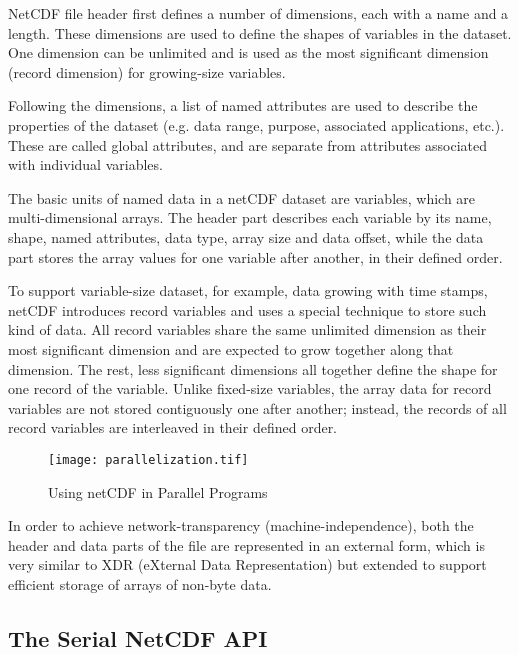 \documentclass[10pt,twocolumn]{article}          %
\begin{document}
NetCDF file header first defines a number of dimensions, each with a name and a length. These
dimensions are used to define the shapes of variables in the dataset. One dimension can be
unlimited and is used as the most significant dimension (record dimension) for growing-size
variables.

Following the dimensions, a list of named attributes are used to describe the properties of the
dataset (e.g. data range, purpose, associated applications, etc.). These are called global
attributes, and are separate from attributes associated with individual variables.

The basic units of named data in a netCDF dataset are variables, which are multi-dimensional
arrays. The header part describes each variable by its name, shape, named attributes, data type,
array size and data offset, while the data part stores the array values for one variable after
another, in their defined order.

To support variable-size dataset, for example, data growing with
time stamps, netCDF introduces record variables and uses a special
technique to store such kind of data. All record variables share
the same unlimited dimension as their most significant dimension
and are expected to grow together along that dimension. The rest,
less significant dimensions all together define the shape for one
record of the variable. Unlike fixed-size variables, the array
data for record variables are not stored contiguously one after
another; instead, the records of all record variables are
interleaved in their defined order.

\begin{figure*}
\begin{center}
\texttt{[image: parallelization.tif]}
\end{center}
\vskip -0.1in \caption{Using netCDF in Parallel Programs}
\label{figure:parallelization}
\end{figure*}

In order to achieve network-transparency (machine-independence),
both the header and data parts of the file are represented in an
external form, which is very similar to XDR (eXternal Data
Representation) but extended to support efficient storage of
arrays of non-byte data.

\subsection{The Serial NetCDF API}
\end{document}
